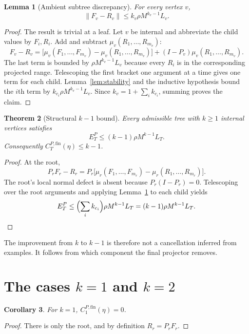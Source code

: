 \documentclass[11pt]{article}
\newtheorem{theorem}{Theorem}[section]
\newtheorem{lemma}[theorem]{Lemma}
\newtheorem{corollary}[theorem]{Corollary}
\theoremstyle{definition}
\newcommand{\fin}{\mathrm{fin}}
\newcommand{\norm}[1]{\left\lVert #1\right\rVert}
\begin{document}
\begin{lemma}[Ambient subtree discrepancy]\label{lem:ambient-subtree}
For every vertex $v$,
\[
 \norm{F_v-R_v}\le k_v\rho M^{k_v-1}L_v.
\]
\end{lemma}
\begin{proof}
The result is trivial at a leaf.  Let $v$ be internal and abbreviate the child
values by $F_i,R_i$.  Add and subtract $\mu_v(R_1,\ldots,R_{m_v})$:
\[
 F_v-R_v=
 \bigl[\mu_v(F_1,\ldots,F_{m_v})-
       \mu_v(R_1,\ldots,R_{m_v})\bigr]
 +(I-P_v)\mu_v(R_1,\ldots,R_{m_v}).
\]
The last term is bounded by
$\rho M^{k_v-1}L_v$ because every $R_i$ is in the corresponding projected
range.  Telescoping the first bracket one argument at a time gives one term
for each child.  Lemma~\ref{lem:stability} and the inductive hypothesis bound
the $i$th term by $k_{c_i}\rho M^{k_v-1}L_v$.  Since
$k_v=1+\sum_i k_{c_i}$, summing proves the claim.
\end{proof}

\begin{theorem}[Structural $k-1$ bound]\label{thm:kminusone}
Every admissible tree with $k\ge1$ internal vertices satisfies
\begin{equation}\label{eq:kminusone}
 \boxed{E_T^P\le(k-1)\rho M^{k-1}L_T.}
\end{equation}
Consequently $C_T^{P,\fin}(\eta)\le k-1$.
\end{theorem}
\begin{proof}
At the root,
\[
 P_rF_r-R_r=
 P_r\bigl[\mu_r(F_1,\ldots,F_{m_r})-
           \mu_r(R_1,\ldots,R_{m_r})\bigr].
\]
The root's local normal defect is absent because $P_r(I-P_r)=0$.
Telescoping over the root arguments and applying
Lemma~\ref{lem:ambient-subtree} to each child yields
\[
 E_T^P\le\Bigl(\sum_i k_{c_i}\Bigr)
 \rho M^{k-1}L_T=(k-1)\rho M^{k-1}L_T.
\]
\end{proof}

The improvement from $k$ to $k-1$ is therefore not a cancellation inferred
from examples.  It follows from which component the final projector removes.

\section{The cases \texorpdfstring{$k=1$ and $k=2$}{k=1 and k=2}}

\begin{corollary}\label{cor:k1}
For $k=1$, $C_1^{P,\fin}(\eta)=0$.
\end{corollary}
\begin{proof}
There is only the root, and by definition $R_r=P_rF_r$.
\end{proof}
\end{document}
